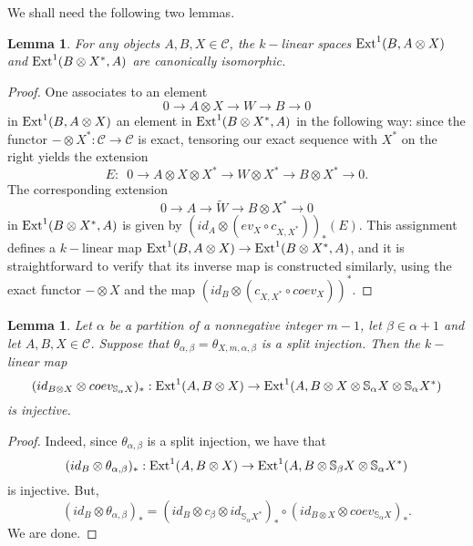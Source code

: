 \documentclass{amsart}
\newtheorem{lemma}[theorem]{Lemma}
\theoremstyle{definition}
\newcommand{\Ext}{\text{\rm Ext}^1}
\newcommand{\ot}{\otimes}
\newcommand{\C}{{\mathcal C}}
\begin{document}
We shall need the following two lemmas.

\begin{lemma}\label{ext}
For any objects $A,B,X\in \C$, the $k-$linear spaces $\Ext(B,A\ot
X)$ and $\Ext(B\ot X^*,A)$ are canonically isomorphic.
\end{lemma}

\begin{proof}
One associates to an element
\begin{equation*}
0\xrightarrow{} A\ot X\xrightarrow{} W\xrightarrow{} B\xrightarrow{}
0
\end{equation*}
in $\Ext(B,A\ot X)$ an element in $\Ext(B\ot X^*,A)$ in the
following way: since the functor $-\ot X^*:\C\to \C$ is exact,
tensoring our exact sequence with $X^*$ on the right yields the
extension
\begin{equation*}\label{equivariantX}
E:\,\,\,0\xrightarrow{} A\ot X\ot X^*\xrightarrow{} W\ot
X^*\xrightarrow{} B\ot X^*\xrightarrow{} 0.
\end{equation*}
The corresponding extension
\begin{equation*}\label{(V)}
0\xrightarrow{} A\xrightarrow{} \tilde W\xrightarrow{} B\ot
X^*\xrightarrow{} 0
\end{equation*}
in $\Ext(B\ot X^*,A)$ is given by $(id_A\ot (ev_X\circ
c_{X,X^*}))_*(E)$. This assignment defines a $k-$linear map
$\Ext(B,A\ot X)\to \Ext(B\ot X^*,A)$, and it is straightforward to
verify that its inverse map is constructed similarly, using the
exact functor $-\ot X$ and the map $(id_B\ot (c_{X,X^*}\circ
coev_X))^*$.
\end{proof}

\begin{lemma}\label{cor}
Let $\alpha$ be a partition of a nonnegative integer $m-1$, let
$\beta\in \alpha+1$ and let $A,B,X\in \C$. Suppose that
$\theta_{\alpha,\beta}=\theta_{X,m,\alpha,\beta}$ is a split
injection. Then the $k-$linear map
$$(id_{B\ot X}\ot coev_{\mathbb{S}_{\alpha}X})_*:\Ext(A,B\ot X)\to
\Ext(A,B\ot X\ot \mathbb{S}_{\alpha}X\ot \mathbb{S}_{\alpha}X^*)$$
is injective.
\end{lemma}

\begin{proof}
Indeed, since $\theta_{\alpha,\beta}$ is a split injection, we have
that
$$(id_B\ot \theta_{\alpha,\beta})_*:\Ext(A,B\ot X)\to \Ext(A,B\ot
\mathbb{S}_{\beta}X\ot \mathbb{S}_{\alpha}X^*)$$ is injective. But,
$$(id_B\ot \theta_{\alpha,\beta})_*=
(id_B\ot c_{\beta}\ot id_{\mathbb{S}_{\alpha}X^*})_*\circ (id_{B\ot
X}\ot coev_{\mathbb{S}_{\alpha}X})_*.$$ We are done.
\end{proof}
\end{document}

